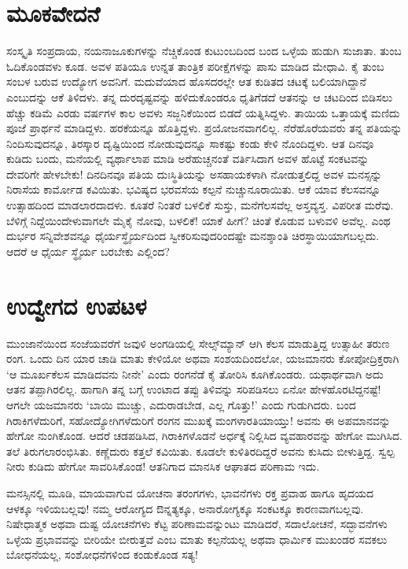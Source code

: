 \section*{ಮೂಕವೇದನೆ}


ಸಂಸ್ಕೃತಿ ಸಂಪ್ರದಾಯ, ನಯನಾಜೂಕುಗಳನ್ನು ನೆಚ್ಚಿಕೊಂಡ ಕುಟುಂಬದಿಂದ ಬಂದ ಒಳ್ಳೆಯ ಹುಡುಗಿ ಸುಜಾತಾ. ತುಂಬ ಓದಿಕೊಂಡವಳು ಕೂಡ. ಅವಳ ಪತಿಯೂ ಉನ್ನತ ತಾಂತ್ರಿಕ ಪರೀಕ್ಷೆಗಳನ್ನು ಪಾಸು ಮಾಡಿದ ಮೇಧಾವಿ. ಕೈ ತುಂಬ ಸಂಬಳ ಬರುವ ಉದ್ಯೋಗ \hbox{ಅವನಿಗೆ.} ಮದುವೆಯಾದ ಹೊಸದರಲ್ಲೇ ಆತ ಕುಡಿತದ ಚಟಕ್ಕೆ ಬಲಿಯಾಗಿದ್ದಾನೆ ಎಂಬುದನ್ನು ಆಕೆ ತಿಳಿದಳು. ತನ್ನ ದುರದೃಷ್ಟವನ್ನು ಹಳಿದುಕೊಂಡರೂ ಧೃತಿಗೆಡದೆ ಆತನನ್ನು ಆ ಚಟದಿಂದ ಬಿಡಿಸಲು ಹೆಚ್ಚು ಕಡಿಮೆ ಎರಡು ವರ್ಷಗಳ ಕಾಲ ಅವಳು ಸಜ್ಜನಿಕೆಯಿಂದ ಬಿಡದೆ ಯತ್ನಿಸಿದ್ದಳು. ತಾಯಿಯ ಒತ್ತಾಯಕ್ಕೆ ಮಣಿದು ಪೂಜೆ ಪ್ರಾರ್ಥನೆ ಮಾಡಿದ್ದಳು. ಹರಕೆಯನ್ನೂ ಹೊತ್ತಿದ್ದಳು. ಪ್ರಯೋಜನವಾಗಲಿಲ್ಲ. ನೆರೆಹೊರೆಯವರು ತನ್ನ ಪತಿಯನ್ನು ನಿಂದಿಸುವುದನ್ನೂ, ತಿರಸ್ಕಾರ ದೃಷ್ಟಿಯಿಂದ ನೋಡುವುದನ್ನೂ ಸಾಕಷ್ಟು ಕಂಡು ಕೇಳಿ ನೊಂದಿದ್ದಳು. ಆತ ದಿನವೂ ಕುಡಿದು ಬಂದು, ಮನೆಯಲ್ಲಿ ವ್ಯರ್ಥಾಲಾಪ ಮಾಡಿ ಅರೆಹುಚ್ಚನಂತೆ ವರ್ತಿಸಿದಾಗ ಅವಳ ಹೊಟ್ಟೆ ಸಂಕಟವನ್ನು ದೇವರಿಗೇ ಹೇಳಬೇಕು! ದಿನದಿನವೂ ಪತಿಯ ದುಃಸ್ಥಿತಿಯನ್ನು ಅಸಹಾಯಕಳಾಗಿ ನೋಡುತ್ತಲಿದ್ದ ಅವಳ ಮನಸ್ಸನ್ನು ನಿರಾಸೆಯ ಕಾರ್ಮೋಡ ಕವಿಯಿತು. ಭವಿಷ್ಯದ ಭರವಸೆಯ ಕಲ್ಪನೆ ನುಚ್ಚುನೂರಾಯಿತು. ಆಕೆ ಯಾವ ಕೆಲಸವನ್ನೂ ಉತ್ಸಾಹದಿಂದ ಮಾಡಲಾರದಾದಳು. ಕೂತರೆ ನಿಂತರೆ ಬಳಲಿಕೆ ಸುಸ್ತು, ಮನೆಗೆಲಸವೆಲ್ಲ ಅಸ್ತವ್ಯಸ್ತ. ವಿಪರೀತ ಮರೆವು. ಬೆಳಿಗ್ಗೆ ನಿದ್ದೆಯಿಂದೇಳುವಾಗಲೇ ಮೈಕೈ ನೋವು, ಬಳಲಿಕೆ! ಯಾಕೆ ಹೀಗೆ? ಚಿಂತೆ ಕೊಡುವ ಬಳುವಳಿ ಅವೆಲ್ಲ. ಎಂಥ ದುರ್ಭರ ಸನ್ನಿವೇಶವನ್ನೂ ಧೈರ್ಯಸ್ಥೈರ್ಯದಿಂದ ಸ್ವೀಕರಿಸುವುದರಿಂದಷ್ಟೇ ಮನಶ್ಶಾಂತಿ ಚಿರಸ್ಥಾಯಿಯಾಗಬಲ್ಲದು. ಆದರೆ ಆ ಧೈರ್ಯ ಸ್ಥೈರ್ಯ ಬರಬೇಕು ಎಲ್ಲಿಂದ?


\section*{ಉದ್ವೇಗದ ಉಪಟಳ}


ಮುಂಜಾನೆಯಿಂದ ಸಂಜೆಯವರೆಗೆ ಜವುಳಿ ಅಂಗಡಿಯಲ್ಲಿ ಸೇಲ್ಸ್​ಮ್ಯಾನ್ ಆಗಿ ಕೆಲಸ ಮಾಡುತ್ತಿದ್ದ ಉತ್ಸಾಹೀ ತರುಣ ರಂಗ. ಒಂದು ದಿನ ಯಾರ ಚಾಡಿ ಮಾತು ಕೇಳಿಯೋ ಅಥವಾ ಸಂಶಯ\-ದಿಂದಲೋ, ಯಜಮಾನರು ಕೋಪೋದ್ರಿಕ್ತರಾಗಿ ‘ಆ ಮೂರ್ಖಕೆಲಸ ಮಾಡಿದವನು ನೀನೇ’ ಎಂದು ರಂಗನೆಡೆ ಕೈ ತೋರಿಸಿ ಕೂಗಿಕೊಂಡರು. ಯಥಾರ್ಥವಾಗಿ ಅದು ಆತನ ತಪ್ಪಾಗಿರಲಿಲ್ಲ. ಹಾಗಾಗಿ ತನ್ನ ಬಗ್ಗೆ ಉಂಟಾದ ತಪ್ಪು ತಿಳಿವನ್ನು ಸರಿಪಡಿಸಲು ಏನೋ ಹೇಳಹೊರಟಿದ್ದನಷ್ಟೆ! ಆಗಲೇ ಯಜಮಾನರು ‘ಬಾಯಿ ಮುಚ್ಚು, ಎದುರಾಡಬೇಡ, ಎಲ್ಲ ಗೊತ್ತು!’ ಎಂದು ಗುಡುಗಿದರು. ಬಂದ ಗಿರಾಕಿಗಳೆದುರಿಗೆ, ಸಹೋದ್ಯೋಗಿಗಳೆದುರಿಗೆ ರಂಗನ ಮುಖಕ್ಕೆ ಮಂಗಳಾರತಿ\-ಯಾಯ್ತು! ಅವನು ಈ ಅಪಮಾನವನ್ನು ಹೇಗೋ ನುಂಗಿಕೊಂಡ. ಆದರೆ ಚಡಪಡಿಸಿದ, ಗಿರಾಕಿಗಳೊಡನೆ ಅರ್ಧಕ್ಕೆ ನಿಲ್ಲಿಸಿದ ವ್ಯವಹಾರವನ್ನು ಹೇಗೋ ಮುಗಿಸಿದ. ತಲೆ ತಿರುಗ\-ಲಾರಂಭಿ\-ಸಿತು. ಕಣ್ಣೆದುರು ಕತ್ತಲೆ ಕವಿಯಿತು. ಕೂಡಲೇ ಕುಳಿತಿರದಿದ್ದರೆ ಅವನು ಕುಸಿದು ಬೀಳುತ್ತಿದ್ದ. ಸ್ವಲ್ಪ ನೀರು ಕುಡಿದು ಹೇಗೋ ಸಾವರಿಸಿಕೊಂಡ! ಆತನಿಗಾದ ಮಾನಸಿಕ ಆಘಾತದ ಪರಿಣಾಮ ಇದು.

ಮನಸ್ಸಿನಲ್ಲಿ ಮೂಡಿ, ಮಾಯವಾಗುವ ಯೋಚನಾ ತರಂಗಗಳು, ಭಾವನೆಗಳು ರಕ್ತ ಪ್ರವಾಹ ಹಾಗೂ ಹೃದಯದ ಆಳಕ್ಕೂ ಇಳಿಯಬಲ್ಲವು! ನಮ್ಮ ಆರೋಗ್ಯದ ಔನ್ನತ್ಯಕ್ಕೂ, ಅನಾರೋಗ್ಯಕ್ಕೂ ಸಂಕಟಕ್ಕೂ ಕಾರಣವಾಗಬಲ್ಲವು. ನಿಷೇಧಾತ್ಮಕ ಅಥವಾ ದುಷ್ಟ ಯೋಚನೆಗಳು ಕೆಟ್ಟ ಪರಿಣಾಮ\-ವನ್ನುಂಟು ಮಾಡಿದರೆ, ಸದಾಲೋಚನೆ, ಸದ್ಭಾವನೆಗಳು ಒಳ್ಳೆಯ ಪ್ರಭಾವವನ್ನು ಬೀರಿಯೇ ಬೀರುತ್ತವೆ ಎಂಬ ಮಾತು ಕಲ್ಪನೆಯಲ್ಲ ಅಥವಾ ಧಾರ್ಮಿಕ ಮುಖಂಡರ ಸವಕಲು ಬೋಧನೆಯಲ್ಲ, ಸಂಶೋಧನೆಗಳಿಂದ ಕಂಡುಕೊಂಡ ಸತ್ಯ!


